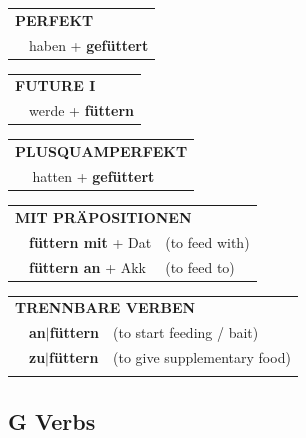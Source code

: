 \documentclass[10pt,a4paper]{revtex4-2}
\begin{document}
\begin{verbbox}
    \vspace{10pt}

 \begin{tabular}{rl}
     \multicolumn{2}{l}{\textbf{PERFEKT}}\\
   & haben + \textbf{gefüttert}\\
  \end{tabular}
\hfill
   \begin{tabular}{rl}
    \multicolumn{2}{l}{\textbf{FUTURE I} }\\
   & werde + \textbf{füttern}\\
  \end{tabular}
\hfill
   \begin{tabular}{rl}
      \multicolumn{2}{l}{\textbf{PLUSQUAMPERFEKT}}\\
   & hatten + \textbf{gefüttert}\\
  \end{tabular}

   \vspace{10pt}

   \begin{tabular}{lll}
      \multicolumn{3}{l}{\textbf{MIT PRÄPOSITIONEN}}\\
& \textbf{füttern mit} + Dat & (to feed with)\\
& \textbf{füttern an} + Akk & (to feed to)\\
\end{tabular}
  \hfill
   \begin{tabular}{lll}
      \multicolumn{3}{l}{\textbf{TRENNBARE VERBEN}}\\
 & \textbf{an$|$füttern} & (to start feeding / bait)\\
 & \textbf{zu$|$füttern} & (to give supplementary food)\\
\vspace{10pt}
  \end{tabular}

  \vspace{-5pt}

\end{verbbox}

\subsection{G Verbs}
\end{document}

